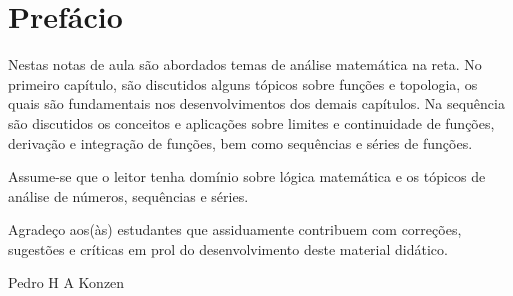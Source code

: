 
\chapter*{Prefácio}\label{prefacio}

Nestas notas de aula são abordados temas de análise matemática na reta. No primeiro capítulo, são discutidos alguns tópicos sobre funções e topologia, os quais são fundamentais nos desenvolvimentos dos demais capítulos. Na sequência são discutidos os conceitos e aplicações sobre limites e continuidade de funções, derivação e integração de funções, bem como sequências e séries de funções.

Assume-se que o leitor tenha domínio sobre lógica matemática e os tópicos de análise de números, sequências e séries.

Agradeço aos(às) estudantes que assiduamente contribuem com correções, sugestões e críticas em prol do desenvolvimento deste material didático.

\begin{flushright}
  Pedro H A Konzen
\end{flushright}